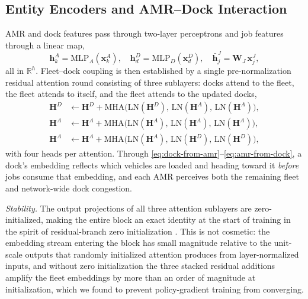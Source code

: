 \subsection{Entity Encoders and AMR--Dock Interaction}
\label{sec:interaction}

AMR and dock features pass through two-layer perceptrons and job
features through a linear map,
\begin{equation}
\bm{h}^{A}_k=\mathrm{MLP}_{A}(\bm{x}^{A}_k),\quad
\bm{h}^{D}_d=\mathrm{MLP}_{D}(\bm{x}^{D}_d),\quad
\bar{\bm{h}}^{J}_j=\bm{W}_{\!J}\,\bm{x}^{J}_j,
\end{equation}
all in $\mathbb{R}^{h}$. Fleet--dock coupling is then established by a
single pre-normalization residual attention round
\cite{vaswani2017attention,xiong2020preln} consisting of three
sublayers: docks attend to the fleet, the fleet attends to itself, and
the fleet attends to the updated docks,
\begin{align}
\bm{H}^{D} &\leftarrow \bm{H}^{D} +
\mathrm{MHA}\big(\mathrm{LN}(\bm{H}^{D}),\,\mathrm{LN}(\bm{H}^{A}),\,\mathrm{LN}(\bm{H}^{A})\big),
\label{eq:dock-from-amr}\\
\bm{H}^{A} &\leftarrow \bm{H}^{A} +
\mathrm{MHA}\big(\mathrm{LN}(\bm{H}^{A}),\,\mathrm{LN}(\bm{H}^{A}),\,\mathrm{LN}(\bm{H}^{A})\big),
\label{eq:amr-self}\\
\bm{H}^{A} &\leftarrow \bm{H}^{A} +
\mathrm{MHA}\big(\mathrm{LN}(\bm{H}^{A}),\,\mathrm{LN}(\bm{H}^{D}),\,\mathrm{LN}(\bm{H}^{D})\big),
\label{eq:amr-from-dock}
\end{align}
with four heads per attention. Through
\eqref{eq:dock-from-amr}--\eqref{eq:amr-from-dock}, a dock's embedding
reflects which vehicles are loaded and heading toward it \emph{before}
jobs consume that embedding, and each AMR perceives both the remaining
fleet and network-wide dock congestion.

\emph{Stability.} The output projections of all three attention
sublayers are zero-initialized, making the entire block an exact
identity at the start of training in the spirit of residual-branch
zero initialization \cite{bachlechner2021rezero,goyal2017accurate}.
This is not cosmetic: the embedding stream entering the block has small
magnitude relative to the unit-scale outputs that randomly initialized
attention produces from layer-normalized inputs, and without
zero initialization the three stacked residual additions amplify the
fleet embeddings by more than an order of magnitude at initialization,
which we found to prevent policy-gradient training from converging.

